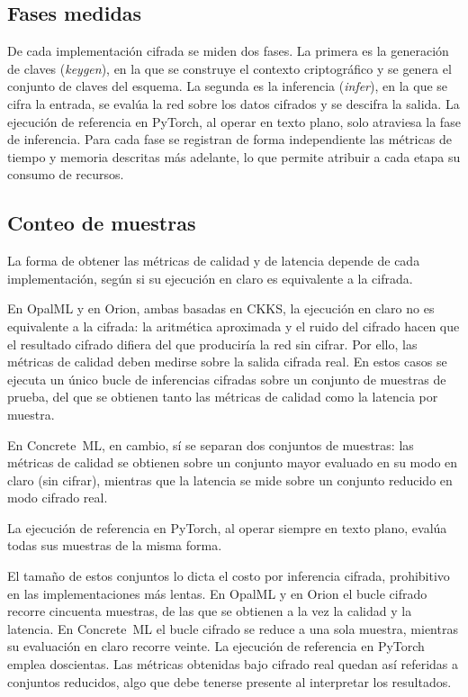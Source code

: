 \subsection{Fases medidas}

De cada implementación cifrada se miden dos fases. La primera es la generación de claves (\textit{keygen}), en la que se construye el contexto criptográfico y se genera el conjunto de claves del esquema. La segunda es la inferencia (\textit{infer}), en la que se cifra la entrada, se evalúa la red sobre los datos cifrados y se descifra la salida. La ejecución de referencia en PyTorch, al operar en texto plano, solo atraviesa la fase de inferencia. Para cada fase se registran de forma independiente las métricas de tiempo y memoria descritas más adelante, lo que permite atribuir a cada etapa su consumo de recursos.

\subsection{Conteo de muestras}\label{sec:metodo_muestras}

La forma de obtener las métricas de calidad y de latencia depende de cada implementación, según si su ejecución en claro es equivalente a la cifrada.

En OpalML y en Orion, ambas basadas en CKKS, la ejecución en claro no es equivalente a la cifrada: la aritmética aproximada y el ruido del cifrado hacen que el resultado cifrado difiera del que produciría la red sin cifrar. Por ello, las métricas de calidad deben medirse sobre la salida cifrada real. En estos casos se ejecuta un único bucle de inferencias cifradas sobre un conjunto de muestras de prueba, del que se obtienen tanto las métricas de calidad como la latencia por muestra.

En Concrete~ML, en cambio, sí se separan dos conjuntos de muestras: las métricas de calidad se obtienen sobre un conjunto mayor evaluado en su modo en claro (sin cifrar), mientras que la latencia se mide sobre un conjunto reducido en modo cifrado real.

La ejecución de referencia en PyTorch, al operar siempre en texto plano, evalúa todas sus muestras de la misma forma.

El tamaño de estos conjuntos lo dicta el costo por inferencia cifrada, prohibitivo en las implementaciones más lentas. En OpalML y en Orion el bucle cifrado recorre cincuenta muestras, de las que se obtienen a la vez la calidad y la latencia. En Concrete~ML el bucle cifrado se reduce a una sola muestra, mientras su evaluación en claro recorre veinte. La ejecución de referencia en PyTorch emplea doscientas. Las métricas obtenidas bajo cifrado real quedan así referidas a conjuntos reducidos, algo que debe tenerse presente al interpretar los resultados.

